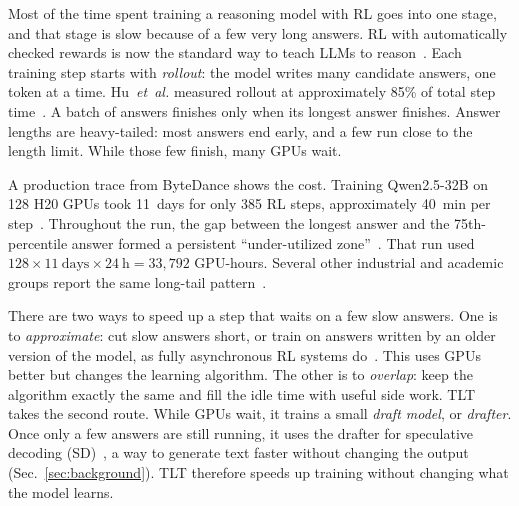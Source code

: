 \documentclass[conference]{IEEEtran}
\begin{document}
Most of the time spent training a reasoning model with RL goes into one stage, and that stage is slow because of a few very long answers. RL with automatically checked rewards is now the standard way to teach LLMs to reason~\cite{shao2024deepseekmath,deepseekr1}. Each training step starts with \emph{rollout}: the model writes many candidate answers, one token at a time. Hu~\emph{et~al.} measured rollout at approximately 85\% of total step time~\cite[Sec.~1, Fig.~1a]{hu2026tlt}. A batch of answers finishes only when its longest answer finishes. Answer lengths are heavy-tailed: most answers end early, and a few run close to the length limit. While those few finish, many GPUs wait.

A production trace from ByteDance shows the cost. Training Qwen2.5-32B on 128 H20 GPUs took 11~days for only 385 RL steps, approximately 40~min per step~\cite[Sec.~1, Fig.~2]{hu2026tlt}. Throughout the run, the gap between the longest answer and the 75th-percentile answer formed a persistent ``under-utilized zone''~\cite[Fig.~2]{hu2026tlt}. That run used $128 \times 11~\text{days} \times 24~\text{h} = 33{,}792$ GPU-hours. Several other industrial and academic groups report the same long-tail pattern~\cite[Sec.~1]{hu2026tlt}.

There are two ways to speed up a step that waits on a few slow answers. One is to \emph{approximate}: cut slow answers short, or train on answers written by an older version of the model, as fully asynchronous RL systems do~\cite{fu2025areal,zhou2025april}. This uses GPUs better but changes the learning algorithm. The other is to \emph{overlap}: keep the algorithm exactly the same and fill the idle time with useful side work. TLT~\cite{hu2026tlt} takes the second route. While GPUs wait, it trains a small \emph{draft model}, or \emph{drafter}. Once only a few answers are still running, it uses the drafter for speculative decoding (SD)~\cite{leviathan2023,chen2023}, a way to generate text faster without changing the output (Sec.~\ref{sec:background}). TLT therefore speeds up training without changing what the model learns.
\end{document}
